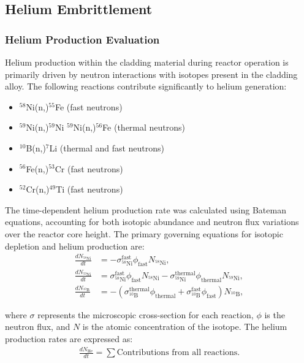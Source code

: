 \subsection{Helium Embrittlement}
\subsubsection{Helium Production Evaluation}

Helium production within the cladding material during reactor operation is primarily driven by neutron interactions with isotopes present in the cladding alloy. The following reactions contribute significantly to helium generation:
\begin{itemize}
    \item $^{58}$Ni(n,\alpha)$^{55}$Fe (fast neutrons)
    \item $^{59}$Ni(n,\gamma)$^{59}$Ni \rightarrow $^{59}$Ni(n,\alpha)$^{56}$Fe (thermal neutrons)
    \item $^{10}$B(n,\alpha)$^{7}$Li (thermal and fast neutrons)
    \item $^{56}$Fe(n,\alpha)$^{53}$Cr (fast neutrons)
    \item $^{52}$Cr(n,\alpha)$^{49}$Ti (fast neutrons)
\end{itemize}

The time-dependent helium production rate was calculated using Bateman equations, accounting for both isotopic abundance and neutron flux variations over the reactor core height. The primary governing equations for isotopic depletion and helium production are:
\begin{align}
    \frac{dN_{^{58}\text{Ni}}}{dt} &= -\sigma_{^{58}\text{Ni}}^\text{fast} \phi_\text{fast} N_{^{58}\text{Ni}}, \\
    \frac{dN_{^{59}\text{Ni}}}{dt} &= \sigma_{^{58}\text{Ni}}^\text{fast} \phi_\text{fast} N_{^{58}\text{Ni}} - \sigma_{^{59}\text{Ni}}^\text{thermal} \phi_\text{thermal} N_{^{59}\text{Ni}}, \\
    \frac{dN_{^{10}\text{B}}}{dt} &= -\left(\sigma_{^{10}\text{B}}^\text{thermal} \phi_\text{thermal} + \sigma_{^{10}\text{B}}^\text{fast} \phi_\text{fast}\right) N_{^{10}\text{B}},
\end{align}

where $\sigma$ represents the microscopic cross-section for each reaction, $\phi$ is the neutron flux, and $N$ is the atomic concentration of the isotope. The helium production rates are expressed as:
\begin{align}
    \frac{dN_{\text{He}}}{dt} = \sum \text{Contributions from all reactions.}
\end{align}

